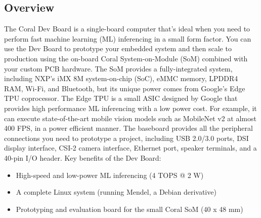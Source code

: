 \subsection{Overview}
\label{ssec:hard-devboard-overview}
The Coral Dev Board is a single-board computer that's ideal when you need to
perform fast machine learning (ML) inferencing in a small form factor. You can
use the Dev Board to prototype your embedded system and then scale to production
using the on-board Coral System-on-Module (SoM) combined with your custom PCB
hardware. The SoM provides a fully-integrated system, including NXP's iMX 8M
system-on-chip (SoC), eMMC memory, LPDDR4 RAM, Wi-Fi, and Bluetooth, but its
unique power comes from Google's Edge TPU coprocessor. The Edge TPU is a small
ASIC designed by Google that provides high performance ML inferencing with a low
power cost. For example, it can execute state-of-the-art mobile vision models
such as MobileNet v2 at almost 400 FPS, in a power efficient manner. 
The baseboard provides all the peripheral connections you need to prototype a
project, including USB 2.0/3.0 ports, DSI display interface, CSI-2 camera
interface, Ethernet port, speaker terminals, and a 40-pin I/O header. \hfill \break
Key benefits of the Dev Board:
\begin{itemize}
	\item High-speed and low-power ML inferencing (4 TOPS @ 2 \si{\watt})
	\item A complete Linux system (running Mendel, a Debian derivative)
	\item Prototyping and evaluation board for the small Coral SoM (40 x 48 \si{\milli\meter})
\end{itemize}
%
